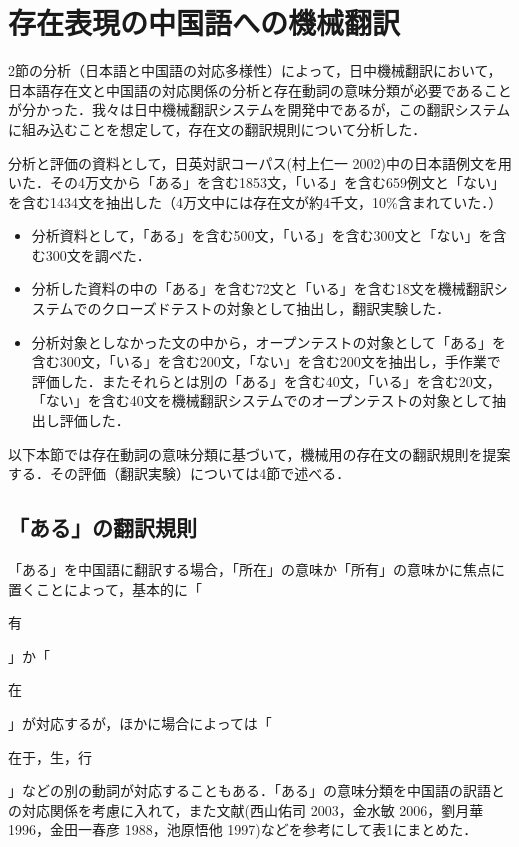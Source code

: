 \documentclass[japanese]{jnlp_1.4}
\begin{document}
\section{存在表現の中国語への機械翻訳}

2節の分析（日本語と中国語の対応多様性）によって，日中機械翻訳において，日本語存在文と中国語の対応関係の分析と存在動詞の意味分類が必要であることが分かった．我々は日中機械翻訳システムを開発中であるが，この翻訳システムに組み込むことを想定して，存在文の翻訳規則について分析した．

分析と評価の資料として，日英対訳コーパス(村上仁一 2002)中の日本語例文を用いた．その4万文から「ある」を含む1853文，「いる」を含む659例文と「ない」を含む1434文を抽出した（4万文中には存在文が約4千文，10\%含まれていた．）

\begin{itemize}
\item[\UTF{2460}]
分析資料として，「ある」を含む500文，「いる」を含む300文と「ない」を含む300文を調べた．

\item[\UTF{2461}]
分析した資料の中の「ある」を含む72文と「いる」を含む18文を機械翻訳システムでのクローズドテストの対象として抽出し，翻訳実験した．

\item[\UTF{2462}]
分析対象としなかった文の中から，オープンテストの対象として「ある」を含む300文，「いる」を含む200文，「ない」を含む200文を抽出し，手作業で評価した．またそれらとは別の「ある」を含む40文，「いる」を含む20文，「ない」を含む40文を機械翻訳システムでのオープンテストの対象として抽出し評価した．
\end{itemize}

以下本節では存在動詞の意味分類に基づいて，機械用の存在文の翻訳規則を提案する．その評価（翻訳実験）については4節で述べる．




\subsection{「ある」の翻訳規則}

「ある」を中国語に翻訳する場合，「所在」の意味か「所有」の意味かに焦点に置くことによって，基本的に「\begin{簡体中文}有\end{簡体中文}」か「\begin{簡体中文}在\end{簡体中文}」が対応するが，ほかに場合によっては「\begin{簡体中文}在于，生，行\end{簡体中文}」などの別の動詞が対応することもある．「ある」の意味分類を中国語の訳語との対応関係を考慮に入れて，また文献(西山佑司 2003，金水敏 2006，劉月華 1996，金田一春彦 1988，池原悟他 1997)などを参考にして表1にまとめた．
\end{document}
